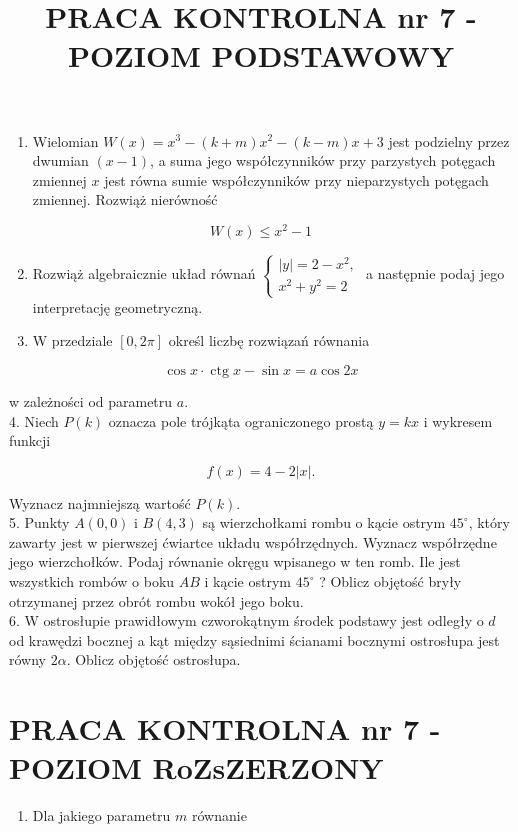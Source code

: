 \documentclass[10pt]{article}
\title{PRACA KONTROLNA nr 7 - POZIOM PODSTAWOWY }
\author{}
\date{}
\begin{document}
\maketitle
\begin{enumerate}
  \item Wielomian $W(x)=x^{3}-(k+m) x^{2}-(k-m) x+3$ jest podzielny przez dwumian $(x-1)$, a suma jego współczynników przy parzystych potęgach zmiennej $x$ jest równa sumie współczynników przy nieparzystych potęgach zmiennej. Rozwiąż nierówność
\end{enumerate}

$$
W(x) \leqslant x^{2}-1
$$

\begin{enumerate}
  \setcounter{enumi}{1}
  \item Rozwiąż algebraicznie układ równań $\left\{\begin{array}{l}|y|=2-x^{2}, \\ x^{2}+y^{2}=2\end{array}\right.$ a następnie podaj jego interpretację geometryczną.
  \item W przedziale $[0,2 \pi]$ określ liczbę rozwiązań równania
\end{enumerate}

$$
\cos x \cdot \operatorname{ctg} x-\sin x=a \cos 2 x
$$

w zależności od parametru $a$.\\
4. Niech $P(k)$ oznacza pole trójkąta ograniczonego prostą $y=k x$ i wykresem funkcji

$$
f(x)=4-2|x| .
$$

Wyznacz najmniejszą wartość $P(k)$.\\
5. Punkty $A(0,0)$ i $B(4,3)$ są wierzchołkami rombu o kącie ostrym $45^{\circ}$, który zawarty jest w pierwszej ćwiartce układu współrzędnych. Wyznacz współrzędne jego wierzchołków. Podaj równanie okręgu wpisanego w ten romb. Ile jest wszystkich rombów o boku $A B$ i kącie ostrym $45^{\circ}$ ? Oblicz objętość bryły otrzymanej przez obrót rombu wokół jego boku.\\
6. W ostrosłupie prawidłowym czworokątnym środek podstawy jest odległy o $d$ od krawędzi bocznej a kąt między sąsiednimi ścianami bocznymi ostrosłupa jest równy $2 \alpha$. Oblicz objętość ostrosłupa.

\section*{PRACA KONTROLNA nr 7 - POZIOM RoZsZERZONY}
\begin{enumerate}
  \item Dla jakiego parametru $m$ równanie
\end{enumerate}
\end{document}
